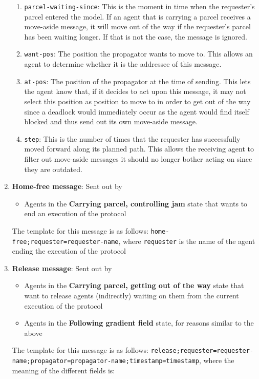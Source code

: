 \begin{enumerate}
\begin{enumerate}
            \item \texttt{parcel-waiting-since}: This is the moment in time when the requester's parcel entered the model. If an agent that is carrying a parcel receives a move-aside message, it will move out of the way if the requester's parcel has been waiting longer. If that is not the case, the message is ignored.
            \item \texttt{want-pos}: The position the propagator wants to move to. This allows an agent to determine whether it is the addressee of this message.
            \item \texttt{at-pos}: The position of the propagator at the time of sending. This lets the agent know that, if it decides to act upon this message, it may not select this position as position to move to in order to get out of the way since a deadlock would immediately occur as the agent would find itself blocked and thus send out its own move-aside message.
            \item \texttt{step}: This is the number of times that the requester has successfully moved forward along its planned path. This allows the receiving agent to filter out move-aside messages it should no longer bother acting on since they are outdated.
        \end{enumerate}
    \item \textbf{Home-free message}: Sent out by
        \begin{itemize}
            \item Agents in the \textbf{Carrying parcel, controlling jam} state that wants to end an execution of the protocol
        \end{itemize} 
    The template for this message is as follows:
    \texttt{home-free;requester=requester-name}, where \texttt{requester} is the name of the agent ending the execution of the protocol
    \item \textbf{Release message}: Sent out by
        \begin{itemize}
            \item Agents in the \textbf{Carrying parcel, getting out of the way} state that want to release agents (indirectly) waiting on them from the current execution of the protocol
            \item Agents in the \textbf{Following gradient field} state, for reasons similar to the above
        \end{itemize}
    The template for this message is as follows:
    \texttt{release;requester=requester-name;propagator=propagator-name;timestamp=timestamp}, where the meaning of the different fields is:

\end{enumerate}
